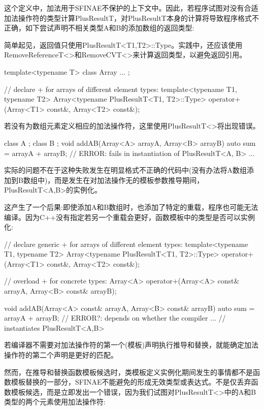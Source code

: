 这个定义中，加法用于SFINAE不保护的上下文中。因此，若程序试图对没有合适加法操作符的类型计算PlusResultT，对PlusResultT本身的计算将导致程序格式不正确，如下尝试声明不相关类型A和B的添加数组的返回类型:

\begin{notice}
简单起见，返回值只使用PlusResultT<T1,T2>::Type。实践中，还应该使用RemoveReferenceT<>和RemoveCVT<>来计算返回类型，以避免返回引用。
\end{notice}

\begin{cpp}
template<typename T>
class Array {
	...
};

// declare + for arrays of different element types:
template<typename T1, typename T2>
Array<typename PlusResultT<T1, T2>::Type>
operator+ (Array<T1> const&, Array<T2> const&);
\end{cpp}

若没有为数组元素定义相应的加法操作符，这里使用PlusResultT<>将出现错误。

\begin{cpp}
class A {
};
class B {
};
void addAB(Array<A> arrayA, Array<B> arrayB) {
	auto sum = arrayA + arrayB; // ERROR: fails in instantiation of PlusResultT<A, B>
	...
}
\end{cpp}

实际的问题不在于这种失败发生在明显格式不正确的代码中(没有办法将A数组添加到B数组中)，而是发生在对加法操作无的模板参数推导期间，PlusResultT<A,B>的实例化。

这产生了一个后果:即使添加A和B数组时，也添加了特定的重载，程序也可能无法编译。因为C++没有指定若另一个重载会更好，函数模板中的类型是否可以实例化:

\begin{cpp}
// declare generic + for arrays of different element types:
template<typename T1, typename T2>
Array<typename PlusResultT<T1, T2>::Type>
operator+ (Array<T1> const&, Array<T2> const&);

// overload + for concrete types:
Array<A> operator+(Array<A> const& arrayA, Array<B> const& arrayB);

void addAB(Array<A> const& arrayA, Array<B> const& arrayB) {
	auto sum = arrayA + arrayB; // ERROR?: depends on whether the compiler
	... // instantiates PlusResultT<A,B>
}
\end{cpp}

若编译器不需要对加法操作符的第一个(模板)声明执行推导和替换，就能确定加法操作符的第二个声明是更好的匹配。

然而，在推导和替换函数模板候选时，类模板定义实例化期间发生的事情都不是函数模板替换的一部分，SFINAE不能避免的形成无效类型或表达式。不是仅丢弃函数模板候选，而是立即发出一个错误，因为我们试图对PlusResultT<>中的A和B类型的两个元素使用加法操作符:

